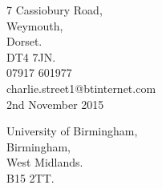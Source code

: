 \documentclass[12pt]{article}
\begin{document}

	\begin{flushright}
		7 Cassiobury Road,\\
		Weymouth,\\
		Dorset.\\
		DT4 7JN.\\
                07917 601977\\
                charlie.street1@btinternet.com\\
                \hfill\break
                2nd November 2015
	\end{flushright}

	\begin{flushleft}
		University of Birmingham,\\
		Birmingham,\\
		West Midlands.\\
		B15 2TT.
	\end{flushleft}
\end{document}
